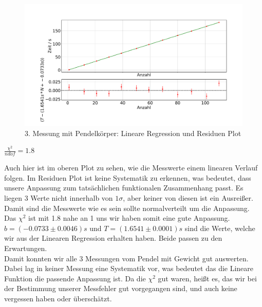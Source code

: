 \documentclass[twoside]{protokoll}
\begin{document}
\begin{figure}[H]
    \centering
    \includegraphics[width=1.0\textwidth]{plots/lineare_regression_gewicht_3.pdf}
    \caption{3. Messung mit Pendelkörper: Lineare Regression und Residuen Plot}
\end{figure}
\begin{center}
    $ \frac{\chi^2}{ndof}  =  1.8$
\end{center}
Auch hier ist im oberen Plot zu sehen, wie die Messwerte einem linearen Verlauf folgen.
Im Residuen Plot ist keine Systematik zu erkennen, was bedeutet, dass unsere Anpassung zum tatsächlichen funktionalen Zusammenhang passt.
Es liegen 3 Werte nicht innerhalb von $1\sigma$, aber keiner von diesen ist ein Ausreißer. Damit sind die Messwerte wie es sein sollte normalverteilt um die Anpassung.
Das $\chi^2$ ist mit 1.8 nahe an 1 uns wir haben somit eine gute Anpassung. 
$b = ( -0.0733 \pm 0.0046)s$ und $T = (1.6541 \pm 0.0001)s$ sind die Werte, welche wir aus der Linearen Regression erhalten haben.
Beide passen zu den Erwartungen. \\

Damit konnten wir alle 3 Messungen vom Pendel mit Gewicht gut auswerten.
Dabei lag in keiner Messung eine Systematik vor, was bedeutet das die Lineare Funktion die passende Anpassung ist.
Da die $\chi^2$ gut waren, heißt es, das wir bei der Bestimmung unserer Messfehler gut vorgegangen sind, und auch keine vergessen haben oder überschätzt.
\end{document}
